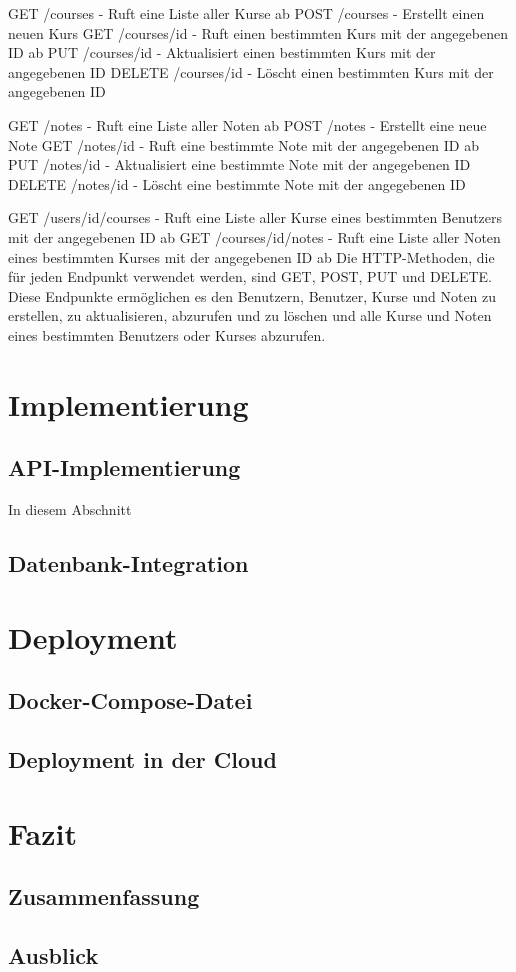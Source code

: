 \documentclass[a4paper,12pt,titlepage]{article}
\begin{document}
GET /courses - Ruft eine Liste aller Kurse ab
POST /courses - Erstellt einen neuen Kurs
GET /courses/{id} - Ruft einen bestimmten Kurs mit der angegebenen ID ab
PUT /courses/{id} - Aktualisiert einen bestimmten Kurs mit der angegebenen ID
DELETE /courses/{id} - Löscht einen bestimmten Kurs mit der angegebenen ID

GET /notes - Ruft eine Liste aller Noten ab
POST /notes - Erstellt eine neue Note
GET /notes/{id} - Ruft eine bestimmte Note mit der angegebenen ID ab
PUT /notes/{id} - Aktualisiert eine bestimmte Note mit der angegebenen ID
DELETE /notes/{id} - Löscht eine bestimmte Note mit der angegebenen ID

GET /users/{id}/courses - Ruft eine Liste aller Kurse eines bestimmten Benutzers mit der angegebenen ID ab
GET /courses/{id}/notes - Ruft eine Liste aller Noten eines bestimmten Kurses mit der angegebenen ID ab
Die HTTP-Methoden, die für jeden Endpunkt verwendet werden, sind GET, POST, PUT und DELETE. Diese Endpunkte ermöglichen es den Benutzern, Benutzer, Kurse und Noten zu erstellen, zu aktualisieren, abzurufen und zu löschen und alle Kurse und Noten eines bestimmten Benutzers oder Kurses abzurufen.

\section{Implementierung}
\subsection{API-Implementierung}
In diesem Abschnitt
\subsection{Datenbank-Integration}

\section{Deployment}
\subsection{Docker-Compose-Datei}
\subsection{Deployment in der Cloud}

\section{Fazit}
\subsection{Zusammenfassung}
\subsection{Ausblick}
\end{document}
